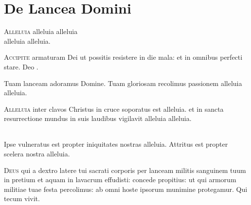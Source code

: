 \chapter{De Lancea Domini}

\lettrine{A}{lleluia}
alleluia alleluia\\ %
alleluia alleluia.

\lettrine{A}{ccipite} armaturam Dei ut possitis resistere in die mala:
et in omnibus perfecti stare.
Deo .


Tuam lanceam adoramus Domine.
Tuam gloriosam recolimus passionem alleluia alleluia.

\lettrine{A}{lleluia}
inter clavos Christus in cruce soporatus est
alleluia.
et in sancta resurrectione mundus in suis laudibus vigilavit
alleluia alleluia.

\\
Ipse vulneratus est propter iniquitates nostras alleluia.
Attritus est propter scelera nostra alleluia.

\lettrine{D}{eus} qui a dextro latere
tui sacrati corporis
per lanceam militis
sanguinem tuum in pretium
et aquam in lavacrum effudisti:
concede propitius:
ut qui armorum militiae tuae festa percolimus:
ab omni hoste ipsorum munimine protegamur.
Qui tecum vivit.


\headingCantus




